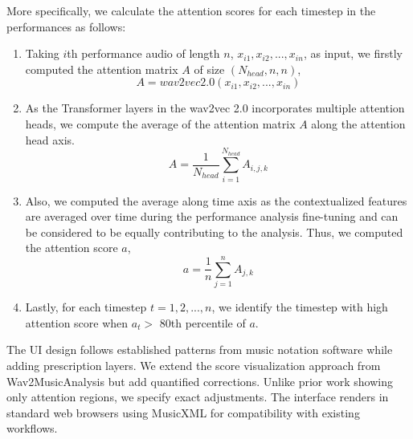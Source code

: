 More specifically, we calculate the attention scores for each timestep in the performances as follows:
\begin{enumerate}
    \item Taking ${i}$th performance audio of length ${n}$, ${x_{i1}, x_{i2}, ..., x_{in}}$, as input, we firstly computed the attention matrix ${A}$ of size ${(N_{head}, n, n)}$,
    \begin{equation}
        A = wav2vec 2.0(x_{i1}, x_{i2}, ..., x_{in})
    \end{equation}
    \item As the Transformer layers in the wav2vec 2.0 incorporates multiple attention heads, we compute the average of the attention matrix ${A}$ along the attention head axis.
    \begin{equation}
        A = \frac{1}{N_{head}} \sum_{i=1}^{N_{head}} A_{i, j, k}
        \end{equation}
    \item Also, we computed the average along time axis as the contextualized features are averaged over time during the performance analysis fine-tuning and can be considered to be equally contributing to the analysis.
    Thus, we computed the attention score ${a}$,
    \begin{equation}
        a = \frac{1}{n} \sum_{j=1}^{n} A_{j, k}
    \end{equation}

    \item Lastly, for each timestep ${t = 1, 2, ..., n}$, we identify the timestep with high attention score when ${a_{t} >}$ 80th percentile of ${a}$.
\end{enumerate}

The UI design follows established patterns from music notation software while adding prescription layers.
We extend the score visualization approach from Wav2MusicAnalysis but add quantified corrections.
Unlike prior work showing only attention regions, we specify exact adjustments.
The interface renders in standard web browsers using MusicXML for compatibility with existing workflows.
